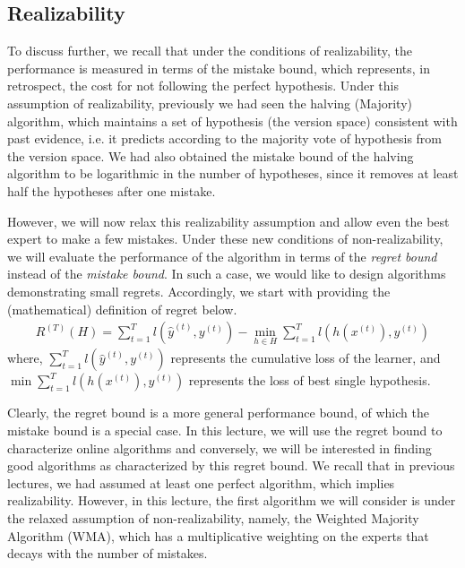 \documentclass[11pt]{article}
\DeclareMathOperator*{\minimize}{min}
\begin{document}
\subsection{Realizability}


\normalfont
To discuss further, we recall that under the conditions of realizability, the performance is measured in terms of the mistake bound, which represents, in retrospect, the cost for not following the perfect hypothesis. Under this assumption of realizability, previously we had seen the halving (Majority) algorithm, which maintains a set of hypothesis (the version space) consistent with past evidence, i.e. it predicts according to the majority vote of hypothesis from the version space. We had also obtained the mistake bound of the halving algorithm to be logarithmic in the number of hypotheses, since it removes at least half the hypotheses after one mistake. 

However, we will now relax this realizability assumption and allow even the best expert to make a few mistakes. Under these new conditions of non-realizability, we will evaluate the performance of the algorithm in terms of the \textit{regret bound} instead of the \textit{mistake bound}. In such a case, we would like to design algorithms demonstrating small regrets. Accordingly, we start with providing the (mathematical) definition of regret below.
\begin{align}
    R^{(T)}(H)=\sum_{t=1}^{T} l(\hat{y}^{(t)}, y^{(t)}) - \minimize_{h\in H}  \sum_{t=1}^{T} l(h(x^{(t)}), y^{(t)})\label{def:regret}
\end{align}
\normalfont
where, $\sum_{t=1}^{T} l(\hat{y}^{(t)}, y^{(t)})$ represents the cumulative loss of the learner, and $\minimize\sum_{t=1}^{T} l(h(x^{(t)}), y^{(t)})$ represents the loss of best single hypothesis. 

Clearly, the regret bound is a more general performance bound, of which the mistake bound is a special case. In this lecture, we will use the regret bound to characterize online algorithms and conversely, we will be interested in finding good algorithms as characterized by this regret bound. We recall that in previous lectures, we had assumed at least one perfect algorithm, which implies realizability. However, in this lecture, the first algorithm we will consider is under the relaxed assumption of non-realizability, namely, the Weighted Majority Algorithm (WMA), which has a multiplicative weighting on the experts that decays with the number of mistakes.
\end{document}
